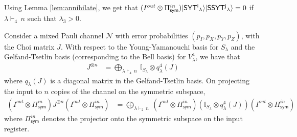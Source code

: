 \documentclass[11pt]{article}
\DeclarePairedDelimiter\ket{\lvert}{\rangle}
\begin{document}
Using Lemma \ref{lem:annihilate}, we get that $(I^{out} \otimes \Pi_{\mathsf{sym}}^{in})\ket{\mathsf{SYT^i}_\lambda} \ket{\mathsf{SSYT^j}_\lambda} = 0$ if $\lambda \vdash_4\, n$ such that $\lambda_3 > 0$.
\begin{theorem}\label{thm:annihilate}
    Consider a mixed Pauli channel $\mathcal{N}$ with error probabilities $(p_I, p_X, p_Y, p_Z)$, with the Choi matrix $J$. With respect to the Young-Yamanouchi basis for $S_{\lambda}$ and the Gelfand-Tsetlin basis (corresponding to the Bell basis) for $V^4_{\lambda}$, we have that
    \begin{align*}
        J^{\otimes n} &= \bigoplus_{\lambda\vdash_4\,n}~\mathbb{I}_{S_{\lambda}} \otimes q^4_{\lambda}(J)
    \end{align*}
    where $q_{\lambda}(J)$ is a diagonal matrix in the Gelfand-Tsetlin basis. On projecting the input to $n$ copies of the channel on the symmetric subspace,
    \begin{align*}
        (I^{out} \otimes \Pi_{\mathsf{sym}}^{in}) J^{\otimes n} (I^{out} \otimes \Pi_{\mathsf{sym}}^{in}) &= \bigoplus_{\lambda\vdash_2\,n}~(I^{out} \otimes \Pi_{\mathsf{sym}}^{in})(\mathbb{I}_{S_{\lambda}} \otimes q^4_{\lambda}(J))(I^{out} \otimes \Pi_{\mathsf{sym}}^{in})
    \end{align*}
    where $\Pi_{\mathsf{sym}}^{in}$ denotes the projector onto the symmetric subspace on the input register.
\end{theorem}
\end{document}
